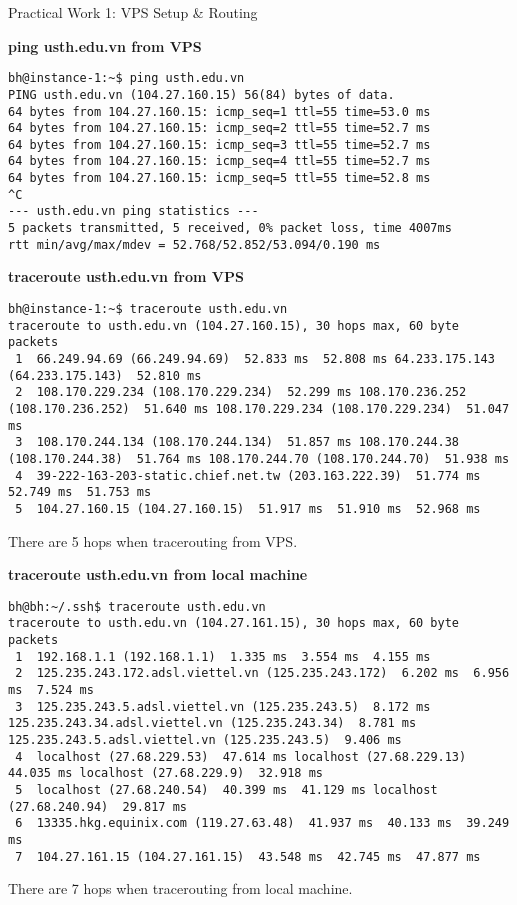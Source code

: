 \documentclass{article}
\begin{document}
Practical Work 1: VPS Setup \& Routing
\\
\par
\textbf{ping usth.edu.vn from VPS}
\begin{lstlisting}
bh@instance-1:~$ ping usth.edu.vn
PING usth.edu.vn (104.27.160.15) 56(84) bytes of data.
64 bytes from 104.27.160.15: icmp_seq=1 ttl=55 time=53.0 ms
64 bytes from 104.27.160.15: icmp_seq=2 ttl=55 time=52.7 ms
64 bytes from 104.27.160.15: icmp_seq=3 ttl=55 time=52.7 ms
64 bytes from 104.27.160.15: icmp_seq=4 ttl=55 time=52.7 ms
64 bytes from 104.27.160.15: icmp_seq=5 ttl=55 time=52.8 ms
^C
--- usth.edu.vn ping statistics ---
5 packets transmitted, 5 received, 0% packet loss, time 4007ms
rtt min/avg/max/mdev = 52.768/52.852/53.094/0.190 ms
\end{lstlisting}

\par
\textbf{traceroute usth.edu.vn from VPS}
\begin{lstlisting}
bh@instance-1:~$ traceroute usth.edu.vn
traceroute to usth.edu.vn (104.27.160.15), 30 hops max, 60 byte packets
 1  66.249.94.69 (66.249.94.69)  52.833 ms  52.808 ms 64.233.175.143 (64.233.175.143)  52.810 ms
 2  108.170.229.234 (108.170.229.234)  52.299 ms 108.170.236.252 (108.170.236.252)  51.640 ms 108.170.229.234 (108.170.229.234)  51.047 ms
 3  108.170.244.134 (108.170.244.134)  51.857 ms 108.170.244.38 (108.170.244.38)  51.764 ms 108.170.244.70 (108.170.244.70)  51.938 ms
 4  39-222-163-203-static.chief.net.tw (203.163.222.39)  51.774 ms  52.749 ms  51.753 ms
 5  104.27.160.15 (104.27.160.15)  51.917 ms  51.910 ms  52.968 ms
\end{lstlisting}
There are 5 hops when tracerouting from VPS.
\\
\par
\textbf{traceroute usth.edu.vn from local machine}
\begin{lstlisting}
bh@bh:~/.ssh$ traceroute usth.edu.vn
traceroute to usth.edu.vn (104.27.161.15), 30 hops max, 60 byte packets
 1  192.168.1.1 (192.168.1.1)  1.335 ms  3.554 ms  4.155 ms
 2  125.235.243.172.adsl.viettel.vn (125.235.243.172)  6.202 ms  6.956 ms  7.524 ms
 3  125.235.243.5.adsl.viettel.vn (125.235.243.5)  8.172 ms 125.235.243.34.adsl.viettel.vn (125.235.243.34)  8.781 ms 125.235.243.5.adsl.viettel.vn (125.235.243.5)  9.406 ms
 4  localhost (27.68.229.53)  47.614 ms localhost (27.68.229.13)  44.035 ms localhost (27.68.229.9)  32.918 ms
 5  localhost (27.68.240.54)  40.399 ms  41.129 ms localhost (27.68.240.94)  29.817 ms
 6  13335.hkg.equinix.com (119.27.63.48)  41.937 ms  40.133 ms  39.249 ms
 7  104.27.161.15 (104.27.161.15)  43.548 ms  42.745 ms  47.877 ms
\end{lstlisting}
There are 7 hops when tracerouting from local machine.
\end{document}

